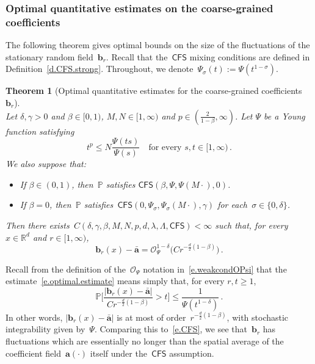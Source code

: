 \documentclass[11pt]{article} %
\numberwithin{equation}{section}
\newtheorem{theorem}{Theorem}[section]
\theoremstyle{definition}
\newcommand*{\R}{\ensuremath{\mathbb{R}}}
\renewcommand{\b}{\ensuremath{\mathbf{b}}}
\renewcommand{\a}{\mathbf{a}}
\newcommand{\ahom}{\bar{\a}}
\renewcommand{\P}{\mathbb{P}}
\renewcommand{\O}{\mathcal{O}}
\newcommand{\CFS}{\mathsf{CFS}}
\begin{document}
\smallskip


\subsubsection{Optimal quantitative estimates on the coarse-grained coefficients}


The following theorem gives optimal bounds on the size of the fluctuations of the stationary random field~$\b_r$. Recall that the~$\CFS$ mixing conditions are defined in Definition~\ref{d.CFS.strong}. Throughout, we denote~$\Psi_\sigma(t) := \Psi(t^{1-\sigma})$.

\begin{theorem}[Optimal quantitative estimates for the coarse-grained coefficients~$\b_r$]
\label{t.optimal}
\textbf{} \\
Let $\delta,\gamma> 0$ and $\beta \in [0,1)$, $M, N \in [1,\infty)$ and $ p \in (\frac{2}{1-\beta},\infty)$.  Let $\Psi$ be a Young function satisfying 
\begin{equation}  \label{e.Psi.pgrowth.theorem}
t^p \leq N \frac{\Psi(t s)}{\Psi(s)}  \quad \mbox{for every $s, t \in [1,\infty)$}\,. 
\end{equation}
We also suppose that:
\begin{itemize}
\item If $\beta \in (0,1)$, then~$\P$ satisfies $\CFS(\beta,\Psi,\Psi(M\cdot),0)$.
\item If $\beta = 0$, then~$\P$ satisfies~$\CFS(0,\Psi_\sigma,\Psi_\sigma(M\cdot),\gamma)$ for each~$\sigma \in \{0,\delta\}$.
\end{itemize}
Then there exists~$C(\delta,\gamma,\beta,M,N,p,d,\lambda,\Lambda,\CFS) < \infty$ such that, for every $x\in \R^d$ and $r \in [1,\infty)$, 
\begin{equation} 
\label{e.optimal.estimate}
\b_{r}(x)  - \ahom  =  \O_{\Psi}^{1-\delta} \bigl(C r^{-\frac d2(1-\beta)}\bigr)
\,.
\end{equation}
\end{theorem}


Recall from the definition of the~$\O_\Psi$ notation in~\eqref{e.weakcondOPsi} that the estimate~\eqref{e.optimal.estimate} means simply that, for every $r,t\geq 1$, 
\begin{equation} 
\label{e.optimal.estimate.Cheby}
\P \Biggl[ \frac{| \b_{r}(x)  - \ahom |}{Cr^{-\frac d2(1-\beta)}} > t \Biggr] 
\leq 
\frac{1}{\Psi(t^{1-\delta})}
\,.
\end{equation}
In other words, $| \b_{r}(x)  - \ahom |$ is at most of order~$r^{-\frac d2(1-\beta)}$, with stochastic integrability given by~$\Psi$. Comparing this to~\eqref{e.CFS}, we see that~$\b_{r}$ has fluctuations which are essentially no longer than the spatial average of the coefficient field~$\a(\cdot)$ itself under the~$\CFS$ assumption.
\end{document}
